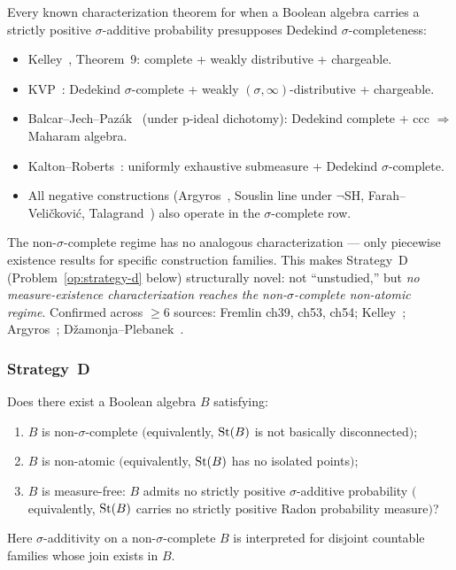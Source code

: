 Every known characterization theorem for when a Boolean algebra
carries a strictly positive $\sigma$-additive probability
presupposes Dedekind $\sigma$-completeness:
\begin{itemize}[nosep]
  \item Kelley~\cite{Kelley1959}, Theorem~9: complete + weakly
    distributive + chargeable.
  \item KVP~\cite[391D]{Fremlin2003}: Dedekind $\sigma$-complete +
    weakly $(\sigma,\infty)$-distributive + chargeable.
  \item Balcar--Jech--Paz\'{a}k~\cite[539N]{Fremlin2003} (under
    p-ideal dichotomy): Dedekind complete + ccc $\Rightarrow$
    Maharam algebra.
  \item Kalton--Roberts~\cite[392F--G]{Fremlin2003}: uniformly
    exhaustive submeasure + Dedekind $\sigma$-complete.
  \item All negative constructions (Argyros~\cite{Argyros1983},
    Souslin line under $\neg$SH, Farah--Veli\v{c}kovi\'{c},
    Talagrand~\cite{Talagrand2008}) also operate in the
    $\sigma$-complete row.
\end{itemize}
The non-$\sigma$-complete regime has no analogous characterization ---
only piecewise existence results for specific construction families.
This makes Strategy~D (Problem~\ref{op:strategy-d} below)
structurally novel: not ``unstudied,'' but \emph{no
measure-existence characterization reaches the non-$\sigma$-complete
non-atomic regime}.  Confirmed across $\geq 6$ sources: Fremlin
ch39, ch53, ch54; Kelley~\cite{Kelley1959};
Argyros~\cite{Argyros1983};
D\v{z}amonja--Plebanek~\cite{DzamonjaPleb2008}.

\subsubsection{Strategy~D}

\begin{openproblem}
\label{op:strategy-d}
Does there exist a Boolean algebra $B$ satisfying:
\begin{enumerate}[label=(\roman*),nosep]
  \item $B$ is non-$\sigma$-complete
    $($equivalently, $\mathrm{St}(B)$ is not basically disconnected$)$;
  \item $B$ is non-atomic
    $($equivalently, $\mathrm{St}(B)$ has no isolated points$)$;
  \item $B$ is measure-free: $B$ admits no strictly positive
    $\sigma$-additive probability
    $($equivalently, $\mathrm{St}(B)$ carries no strictly positive Radon
    probability measure$)$?
\end{enumerate}
Here $\sigma$-additivity on a non-$\sigma$-complete $B$ is
interpreted for disjoint countable families whose join exists in $B$.
\end{openproblem}


